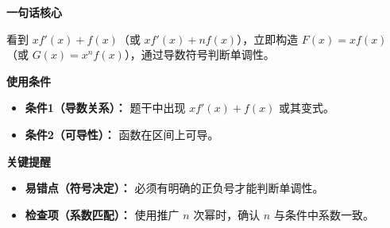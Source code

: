 \begin{summarybox}

	\textbf{\textcolor{CSummary}{一句话核心}}

	看到 $x f'(x)+f(x)$（或 $x f'(x)+n f(x)$），立即构造 $F(x)=x f(x)$（或 $G(x)=x^n f(x)$），通过导数符号判断单调性。

	\medskip
	\textbf{\textcolor{CSummary}{使用条件}}
	\begin{itemize}[leftmargin=*, itemsep=0.5em, topsep=0.4em]
		\item \textbf{条件1（导数关系）：} 题干中出现 $x f'(x)+f(x)$ 或其变式。
		\item \textbf{条件2（可导性）：} 函数在区间上可导。
	\end{itemize}

	\medskip
	\textbf{\textcolor{CSummary}{关键提醒}}
	\begin{itemize}[leftmargin=*, itemsep=0.5em, topsep=0.4em]
		\item \textbf{易错点（符号决定）：} 必须有明确的正负号才能判断单调性。
		\item \textbf{检查项（系数匹配）：} 使用推广 $n$ 次幂时，确认 $n$ 与条件中系数一致。
	\end{itemize}

\end{summarybox}
